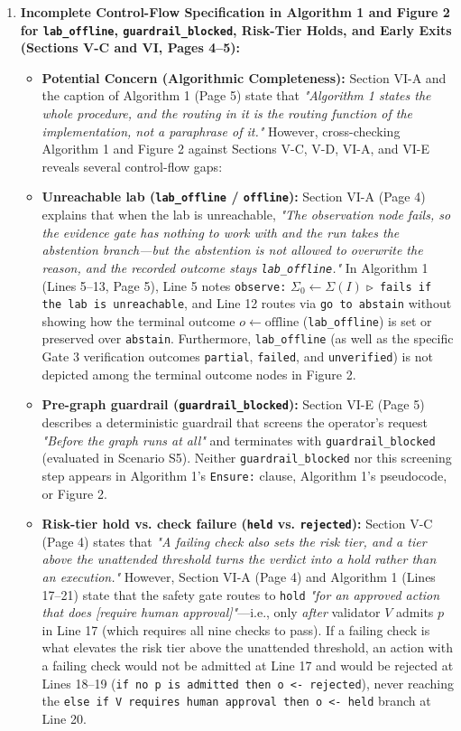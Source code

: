\documentclass[11pt,a4paper]{article}
\begin{document}
\begin{enumerate}[leftmargin=1.6em,itemsep=3pt]
\item \textbf{Incomplete Control-Flow Specification in Algorithm 1 and Figure 2 for \texttt{lab\_offline}, \texttt{guardrail\_blocked}, Risk-Tier Holds, and Early Exits (Sections V-C and VI, Pages 4–5):}
\begin{itemize}[leftmargin=1.8em,itemsep=2pt]
\item \textbf{Potential Concern (Algorithmic Completeness):} Section VI-A and the caption of Algorithm 1 (Page 5) state that \emph{"Algorithm 1 states the whole procedure, and the routing in it is the routing function of the implementation, not a paraphrase of it."} However, cross-checking Algorithm 1 and Figure 2 against Sections V-C, V-D, VI-A, and VI-E reveals several control-flow gaps:
\item \textbf{Unreachable lab (\texttt{lab\_offline} / \texttt{offline}):} Section VI-A (Page 4) explains that when the lab is unreachable, \emph{"The observation node fails, so the evidence gate has nothing to work with and the run takes the abstention branch—but the abstention is not allowed to overwrite the reason, and the recorded outcome stays \texttt{lab\_offline}."} In Algorithm 1 (Lines 5–13, Page 5), Line 5 notes \texttt{observe:} $\Sigma_0 \leftarrow \Sigma(I)$ \texttt{▷ fails if the lab is unreachable}, and Line 12 routes via \texttt{go to abstain} without showing how the terminal outcome $o \leftarrow \text{offline}$ (\texttt{lab\_offline}) is set or preserved over \texttt{abstain}. Furthermore, \texttt{lab\_offline} (as well as the specific Gate 3 verification outcomes \texttt{partial}, \texttt{failed}, and \texttt{unverified}) is not depicted among the terminal outcome nodes in Figure 2.
\item \textbf{Pre-graph guardrail (\texttt{guardrail\_blocked}):} Section VI-E (Page 5) describes a deterministic guardrail that screens the operator's request \emph{"Before the graph runs at all"} and terminates with \texttt{guardrail\_blocked} (evaluated in Scenario S5). Neither \texttt{guardrail\_blocked} nor this screening step appears in Algorithm 1's \texttt{Ensure:} clause, Algorithm 1's pseudocode, or Figure 2.
\item \textbf{Risk-tier hold vs. check failure (\texttt{held} vs. \texttt{rejected}):} Section V-C (Page 4) states that \emph{"A failing check also sets the risk tier, and a tier above the unattended threshold turns the verdict into a hold rather than an execution."} However, Section VI-A (Page 4) and Algorithm 1 (Lines 17–21) state that the safety gate routes to \texttt{hold} \emph{"for an approved action that does [require human approval]"}—i.e., only \emph{after} validator $V$ admits $p$ in Line 17 (which requires all nine checks to pass). If a failing check is what elevates the risk tier above the unattended threshold, an action with a failing check would not be admitted at Line 17 and would be rejected at Lines 18–19 (\texttt{if no p is admitted then o <- rejected}), never reaching the \texttt{else if V requires human approval then o <- held} branch at Line 20.

\end{itemize}
\end{enumerate}
\end{document}
